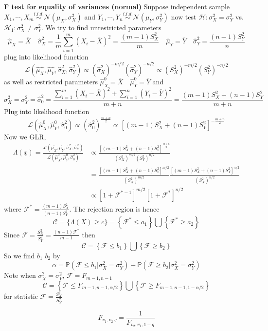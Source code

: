 \documentclass[11pt]{article}
\begin{document}
\begin{example}
  \textbf{F test for equality of variances (normal)} Suppose independent sample $X_1, \cdots, X_m \stackrel{i.i.d.}{\sim} \mathcal{N}(\mu_X, \sigma_X^2)$ and $Y_1, \cdots, Y_n \stackrel{i.i.d.}{\sim}\mathcal{N}(\mu_Y, \sigma_Y^2)$ now test $\mathcal{H}: \sigma_X^2 = \sigma_Y^2$ vs. $\mathcal{H}_1: \sigma_X^2 \neq \sigma_Y^2$. We try to find unrestricted parameters
  \[
    \hat{\mu}_X = \overline{X} \quad \hat{\sigma}_X^2 = \frac{1}{m}\sum_{i=1}^m (X_i - \overline{X})^2 = \frac{(m-1)S_X^2}{m} \quad \hat{\mu}_Y = \overline{Y} \quad \hat{\sigma}_Y^2 =\frac{(n-1)S_Y^2}{n}
  \]
  plug into likelihood function
  \[
    \mathcal{L}(\hat{\mu_X}, \hat{\mu_Y}, \hat{\sigma}_X^2, \hat{\sigma}_Y^2) \propto (\hat{\sigma}_X^2)^{-m/2}(\hat{\sigma}_Y^2)^{-n/2} \propto (S_X^2)^{-m/2} (S_Y^2)^{-n/2}
  \]
  as well as restricted parameters $\hat{\mu}_X^0 = \overline{X} \quad \hat{\mu}_Y^0 = \overline{Y}$ and
  \[
    \sigma_X^2 = \sigma_Y^2 = \hat{\sigma}_0^2 = \frac{\sum_{i=1}^m (X_i - \overline{X})^2 + \sum_{i=1}^n (Y_i - \overline{Y})^2}{m+n} = \frac{(m-1)S_X^2 + (n-1)S_Y^2}{m+n}
  \]
  Plug into likelihood function
  \[
    \mathcal{L}(\hat{\mu}_X^0, \hat{\mu}_Y^0, \hat{\sigma}_0^2) \propto (\hat{\sigma}_0^2)^{\frac{m+n}{2}} \propto [(m-1)S_X^2 + (n-1)S_Y^2]^{-\frac{m+n}{2}}
  \]
  Now we GLR,
  \begin{align*}
    \Lambda(\underline{x}) = \frac{\mathcal{L}(\hat{\mu_X}, \hat{\mu_Y}, \hat{\sigma}_X^2, \hat{\sigma}_Y^2)  }{\mathcal{L}(\hat{\mu}_X^0, \hat{\mu}_Y^0, \hat{\sigma}_0^2)} &\propto \frac{[ (m-1)S_X^2 + (n-1)S_Y^2 ]^{\frac{m+n}{2}}}{(S_X^2)^{m/2} (S_Y^2)^{n/2}} \\
    &= \frac{[ (m-1)S_X^2 + (n-1)S_Y^2 ]^{m/2}}{(S_X^2)^{m/2}}\frac{[ (m-1)S_X^2 + (n-1)S_Y^2 ]^{n/2}}{(S_X^2)^{n/2}} \\
    &\propto [1 + \mathcal{F}^{*-1}]^{m/2}[1 + \mathcal{F}^*]^{n/2}
  \end{align*}
  where $\mathcal{F}^* = \frac{(m-1)S_X^2}{(n-1)S_Y^2}$. The rejection region is hence
  \[
    \mathcal{C} = \{ \Lambda(\underline{X}) \geq c\} = \left\{ \mathcal{F}^* \leq a_1 \right\} \bigcup \left\{ \mathcal{F}^* \geq a_2 \right\}
  \]
  Since $\mathcal{F} = \frac{S_X^2}{S_Y^2} = \frac{(n-1)\mathcal{F}^*}{m-1}$ then
  \[
    \mathcal{C} =  \left\{ \mathcal{F} \leq b_1 \right\} \bigcup \left\{ \mathcal{F} \geq b_2 \right\}
  \]
  So we find $b_1$ $b_2$ by
  \[
    \alpha = \mathbb{P}\left(\mathcal{F}\leq b_1 | \sigma_X^2 = \sigma_Y^2\right) + \mathbb{P}\left(\mathcal{F}\geq b_2 | \sigma_X^2 = \sigma_Y^2\right)
  \]
  Note when $\sigma_X^2 = \sigma_Y^2$, $\mathcal{F} = F_{m-1, n-1}$
  \[
    \mathcal{C} =  \left\{ \mathcal{F} \leq F_{m-1, n-1, \alpha/2} \right\} \bigcup \left\{ \mathcal{F} \geq F_{m-1, n-1, 1-\alpha/2} \right\}
  \]
  for statistic $\mathcal{F} = \frac{S_X^2}{S_Y^2}$
  \begin{rem}
    \[
      F_{v_1, v_2. q} = \frac{1}{F_{v_2, v_1, 1-q}}
    \]
  \end{rem}
\end{example}
\end{document}

